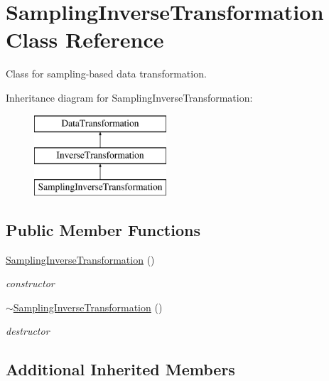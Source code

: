 \section{Sampling\+Inverse\+Transformation Class Reference}
\label{classPecos_1_1SamplingInverseTransformation}


Class for sampling-\/based data transformation.  


Inheritance diagram for Sampling\+Inverse\+Transformation\+:\begin{figure}[H]
\begin{center}
\leavevmode
\includegraphics[height=3.000000cm]{classPecos_1_1SamplingInverseTransformation}
\end{center}
\end{figure}
\subsection*{Public Member Functions}
\begin{DoxyCompactItemize}
\item 
\hyperlink{classPecos_1_1SamplingInverseTransformation_a5953aeb42528d8d0f3cab34c7303957c}{Sampling\+Inverse\+Transformation} ()\label{classPecos_1_1SamplingInverseTransformation_a5953aeb42528d8d0f3cab34c7303957c}

\begin{DoxyCompactList}\small\item\em constructor \end{DoxyCompactList}\item 
\hyperlink{classPecos_1_1SamplingInverseTransformation_a119669281924c48c9838c3ea85806a57}{$\sim$\+Sampling\+Inverse\+Transformation} ()\label{classPecos_1_1SamplingInverseTransformation_a119669281924c48c9838c3ea85806a57}

\begin{DoxyCompactList}\small\item\em destructor \end{DoxyCompactList}\end{DoxyCompactItemize}
\subsection*{Additional Inherited Members}


